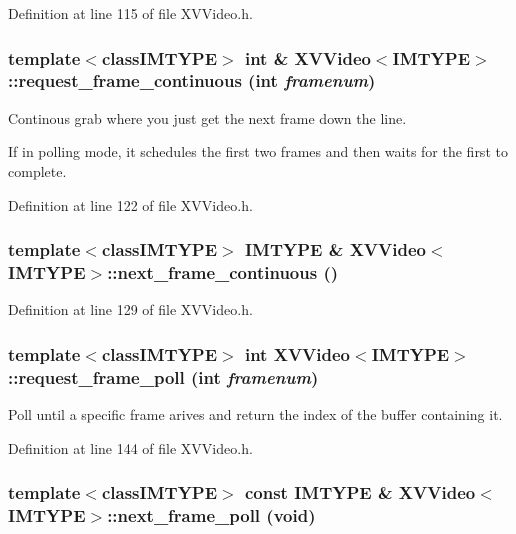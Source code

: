 Definition at line 115 of file XVVideo.h.\label{XVVideo_a9}
\hypertarget{class_XVVideo_a9}{
\subsubsection[request_frame_continuous]{\setlength{\rightskip}{0pt plus 5cm}template$<$classIMTYPE$>$ int \& XVVideo$<$IMTYPE$>$::request\_\-frame\_\-continuous (int {\em framenum})}}


Continous grab where you just get the next frame down the line.

If in polling mode, it schedules the first two frames and then waits for the first to complete. 

Definition at line 122 of file XVVideo.h.\label{XVVideo_a10}
\hypertarget{class_XVVideo_a10}{
\subsubsection[next_frame_continuous]{\setlength{\rightskip}{0pt plus 5cm}template$<$classIMTYPE$>$ IMTYPE \& XVVideo$<$IMTYPE$>$::next\_\-frame\_\-continuous ()}}




Definition at line 129 of file XVVideo.h.\label{XVVideo_a11}
\hypertarget{class_XVVideo_a11}{
\subsubsection[request_frame_poll]{\setlength{\rightskip}{0pt plus 5cm}template$<$classIMTYPE$>$ int XVVideo$<$IMTYPE$>$::request\_\-frame\_\-poll (int {\em framenum})}}


Poll until a specific frame arives and return the index of the buffer containing it.



Definition at line 144 of file XVVideo.h.\label{XVVideo_a12}
\hypertarget{class_XVVideo_a12}{
\subsubsection[next_frame_poll]{\setlength{\rightskip}{0pt plus 5cm}template$<$classIMTYPE$>$ const IMTYPE \& XVVideo$<$IMTYPE$>$::next\_\-frame\_\-poll (void)}}




